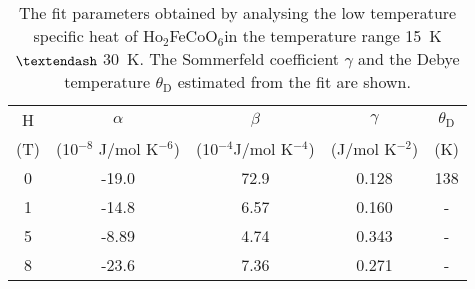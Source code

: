 \documentclass[12pt,twocolumns]{iopart}
\newcommand{\HFCO}{Ho$_2$FeCoO$_6$}
\begin{document}
\clearpage\newpage
\begin{center}
	\begin{table}[!b]
		\setlength{\tabcolsep}{4pt}
		\caption{The fit parameters  obtained by analysing the low temperature specific heat of \HFCO in the temperature range 15~K $\textendash$ 30~K.
			The Sommerfeld coefficient $\gamma$ and the Debye temperature $\theta_\mathrm{D}$ estimated from the fit are shown.  
			\label{tab:cp}}
		\centering
		\begin{tabular}{ccccc}  
			\hline
			H         &   $\alpha$                   & $\beta$                  & $\gamma$     &   $\theta_\mathrm{D}$ \\
			(T)       &   (10$^{-8}$ J/mol K$^{-6}$)   & (10$^{-4}$J/mol K$^{-4}$)  & (J/mol K$^{-2}$)    &           (K)             \\ \hline\hline
			0         & -19.0                        & 72.9                     & 0.128        &          138 \\
			1         & -14.8                        & 6.57                     & 0.160        &           -       \\
			5         & -8.89                        & 4.74                     & 0.343        &           -       \\
			8         & -23.6                        & 7.36                     & 0.271        &           -       \\ \hline\hline
		\end{tabular}
		
	\end{table}
\end{center}
\clearpage\newpage
\end{document}
